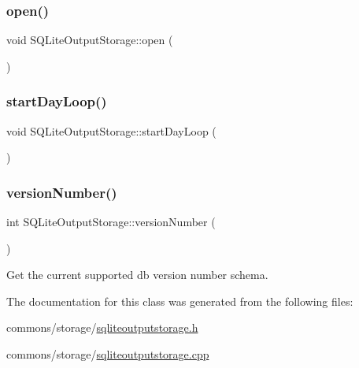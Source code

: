\subsubsection{\texorpdfstring{open()}{open()}}
{\footnotesize\ttfamily void S\+Q\+Lite\+Output\+Storage\+::open (\begin{DoxyParamCaption}{ }\end{DoxyParamCaption})}

\mbox{\label{class_s_q_lite_output_storage_ab56e30576907da1eb48a2287678363c5}} 
\subsubsection{\texorpdfstring{startDayLoop()}{startDayLoop()}}
{\footnotesize\ttfamily void S\+Q\+Lite\+Output\+Storage\+::start\+Day\+Loop (\begin{DoxyParamCaption}{ }\end{DoxyParamCaption})}

\mbox{\label{class_s_q_lite_output_storage_abe6f44858849f2aa51ef7ea27b782447}} 
\subsubsection{\texorpdfstring{versionNumber()}{versionNumber()}}
{\footnotesize\ttfamily int S\+Q\+Lite\+Output\+Storage\+::version\+Number (\begin{DoxyParamCaption}{ }\end{DoxyParamCaption})}



Get the current supported db version number schema. 



The documentation for this class was generated from the following files\+:\begin{DoxyCompactItemize}
\item 
commons/storage/\mbox{\hyperlink{sqliteoutputstorage_8h}{sqliteoutputstorage.\+h}}\item 
commons/storage/\mbox{\hyperlink{sqliteoutputstorage_8cpp}{sqliteoutputstorage.\+cpp}}\end{DoxyCompactItemize}
